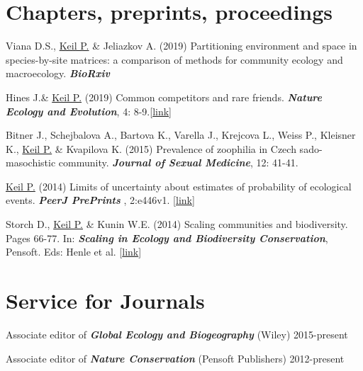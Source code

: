 \section{Chapters, preprints, proceedings}
\begin{etaremune} 

\item Viana D.S., \underline{Keil P.} \& Jeliazkov A. (2019) Partitioning environment and space in species-by-site matrices: a comparison of methods for community ecology and macroecology. \textit{\textbf{BioRxiv}}

\item Hines J.\& \underline{Keil P.} (2019) Common competitors and rare friends. \textit{\textbf{Nature Ecology and Evolution}}, 4: 8-9.[\href{https://www.nature.com/articles/s41559-019-1071-3}{link}]

\item Bitner J., Schejbalova A., Bartova K., Varella J., Krejcova L., Weiss P., Kleisner K., \underline{Keil P.} \& Kvapilova K. (2015) Prevalence of zoophilia in Czech sado-masochistic community. \textit{\textbf{Journal of Sexual Medicine}}, 12: 41-41.

\item \underline{Keil P.} (2014) Limits of uncertainty about estimates of probability of ecological events. \textit{\textbf{PeerJ PrePrints }}, 2:e446v1. [\href{https://peerj.com/preprints/446/}{link}]

\item Storch D., \underline{Keil P.} \& Kunin W.E. (2014) Scaling communities and biodiversity. Pages 66-77. In: \textit{\textbf{Scaling in Ecology and Biodiversity Conservation}}, Pensoft. Eds: Henle et al. [\href{http://ab.pensoft.net/articles.php?id=1169}{link}]
 
\end{etaremune}

\HRule

\section{Service for Journals}

Associate editor of \textit{\textbf{Global Ecology and Biogeography}} (Wiley) \hfill {2015-present}\\

\medskip

Associate editor of \textit{\textbf{Nature Conservation}} (Pensoft Publishers) \hfill {2012-present}\\
\medskip


